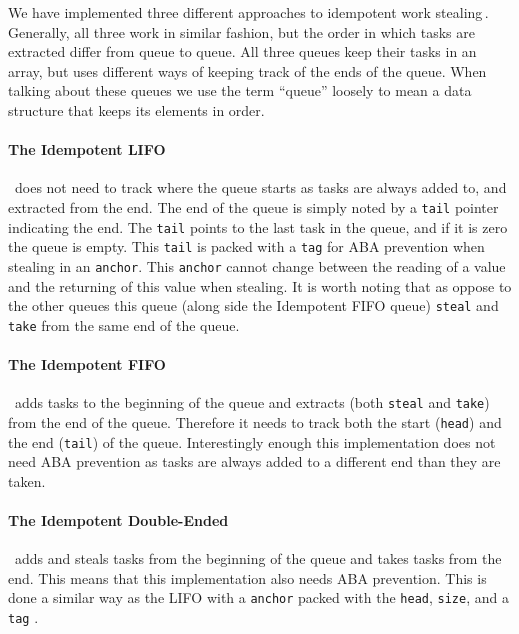We have implemented three different approaches to idempotent work stealing\,\cite{Michael:2009:IWS:1594835.1504186}. Generally, all three work in similar fashion, but the order in which tasks are extracted differ from queue to queue. All three queues keep their tasks in an array, but uses different ways of keeping track of the ends of the queue. When talking about these queues we use the term ``queue'' loosely to mean a data structure that keeps its elements in order.

\paragraph{The Idempotent LIFO}\,\cite[p. 47]{Michael:2009:IWS:1594835.1504186} does not need to track where the queue starts as tasks are always added to, and extracted from the end. The end of the queue is simply noted by a \texttt{tail} pointer indicating the end. The \texttt{tail} points to the last task in the queue, and if it is zero the queue is empty. This \texttt{tail} is packed with a \texttt{tag} for ABA prevention when stealing in an \texttt{anchor}. This \texttt{anchor} cannot change between the reading of a value and the returning of this value when stealing. It is worth noting that as oppose to the other queues this queue (along side the Idempotent FIFO queue) \texttt{steal} and \texttt{take} from the same end of the queue.

\paragraph{The Idempotent FIFO}\,\cite[p. 48]{Michael:2009:IWS:1594835.1504186}  adds tasks to the beginning of the queue and extracts (both \texttt{steal} and \texttt{take}) from the end of the queue. Therefore it needs to track both the start (\texttt{head}) and the end (\texttt{tail}) of the queue. Interestingly enough this implementation does not need ABA prevention as tasks are always added to a different end than they are taken.

\paragraph{The Idempotent Double-Ended} \,\cite[p. 49]{Michael:2009:IWS:1594835.1504186} adds and steals tasks from the beginning of the queue and takes tasks from the end. This means that this implementation also needs ABA prevention. This is done a similar way as the LIFO with a \texttt{anchor} packed with the \texttt{head}, \texttt{size}, and a \texttt{tag} .

